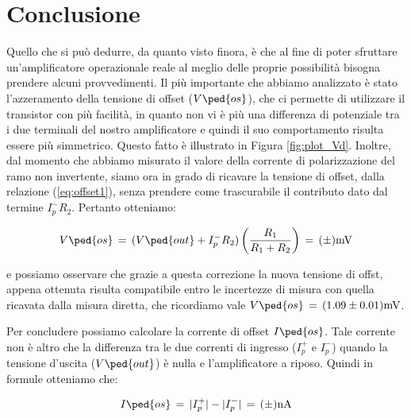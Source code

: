 \section*{Conclusione}

Quello che si può dedurre, da quanto visto finora, è che al fine di poter sfruttare un'amplificatore operazionale reale al meglio delle proprie possibilità bisogna prendere alcuni provvedimenti. Il più importante che abbiamo analizzato è stato l'azzeramento della tensione di offset ($V\ped{os}$), che ci permette di utilizzare il transistor con più facilità, in quanto non vi è più una differenza di potenziale tra i due terminali del nostro amplificatore e quindi il suo comportamento risulta essere più simmetrico. Questo fatto è illustrato in Figura \ref{fig:plot_Vd}.
Inoltre, dal momento che abbiamo misurato il valore della corrente di polarizzazione del ramo non invertente, siamo ora in grado di ricavare la tensione di offset, dalla relazione (\ref{eq:offset1}), senza prendere come trascurabile il contributo dato dal termine $I_{p}^-R_2$. Pertanto otteniamo:

\begin{equation}
	V\ped{os}\,=\,(V\ped{out}+I_{p}^-R_2)\left(\frac{R_1}{R_1+R_2}\right)\,=\,(\pm)\SI{}{\milli\volt}
\end{equation}

e possiamo osservare che grazie a questa correzione la nuova tensione di offst, appena ottenuta risulta compatibile entro le incertezze di misura con quella ricavata dalla misura diretta, che ricordiamo vale $V\ped{os}\,=\,(1.09\pm0.01)\SI{}{\milli\volt}$.

Per concludere possiamo calcolare la corrente di offset $I\ped{os}$. Tale corrente non è altro che la differenza tra le due correnti di ingresso ($I_{p}^+$ e $I_{p}^-$) quando la tensione d'uscita ($V\ped{out}$) è nulla e l'amplificatore a riposo.
Quindi in formule otteniamo che:

\begin{equation}
	I\ped{os}\,=\,|I_{p}^+|-|I_{p}^-|\,=\,(\pm)\SI{}{\nano\ampere}
\end{equation}